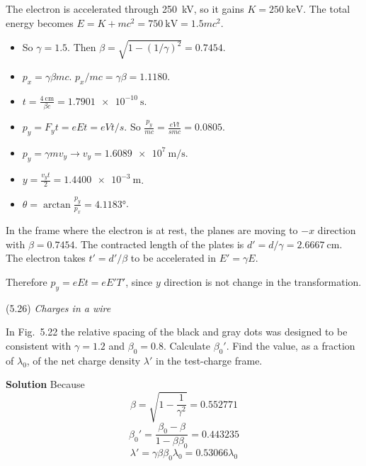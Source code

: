 \documentclass{article}
\begin{document}
\begin{homeworkProblem}
	The electron is accelerated through \SI{250}{\kilo\volt}, so it gains $K=\SI{250}{\kilo\electronvolt}$. The total energy becomes $E=K+mc^2=\SI{750}{\kilo\volt}=1.5mc^2$.
	\begin{enumerate}[label=(\alph*)]
		\begin{item}
			\begin{itemize}
				\item So $\gamma=1.5$. Then $\beta=\sqrt{1-(1/\gamma)^2}=0.7454$.
				\item $p_x=\gamma \beta mc$. $p_x/mc=\gamma \beta=1.1180$.
				\item $t=\frac{\SI{4}{\cm}}{\beta c}=\SI{1.7901e-10}{\s}$.
				\item $p_y=F_y t=eEt=eVt/s$. So $\frac{p_y}{mc}=\frac{eVt}{smc}=0.0805$.
				\item $p_y=\gamma m v_y\longrightarrow v_y=\SI{1.6089e7}{\m\per\s}$.
				\item $y=\frac{v_y t}{2}=\SI{1.4400e-3}{\m}$.
				\item $\theta=\arctan\frac{p_y}{p_x}=\ang{4.1183}$.
			\end{itemize}
		\end{item}
		\begin{item}
			In the frame where the electron is at rest, the planes are moving to $-x$ direction with $\beta=0.7454$. The contracted length of the plates is $d'=d/\gamma=\SI{2.6667}{\cm}$. The electron takes $t'=d'/\beta$ to be accelerated in $E'=\gamma E$.

			Therefore $p_y=eEt=eE'T'$, since $y$ direction is not change in the transformation.
		\end{item}
	\end{enumerate}
\end{homeworkProblem}


\begin{homeworkProblem}
	(5.26) \textit{Charges in a wire}

	In Fig.~5.22 the relative spacing of the black and gray dots was designed to be consistent with $\gamma=1.2$ and $\beta_0=0.8$. Calculate ${\beta_0}'$. Find the value, as a fraction of $\lambda_0$, of the net charge density $\lambda'$ in the test-charge frame.

	\textbf{Solution}
	Because
	\[
		\beta=\sqrt{1-\frac{1}{\gamma^2}}=0.552771
	\]
	\[
		{\beta_0}'=\frac{\beta_0-\beta}{1-\beta\beta_0}=0.443235
	\]
	\[
		\lambda'=\gamma\beta\beta_0\lambda_0=0.53066\lambda_0
	\]
\end{homeworkProblem}
\end{document}
